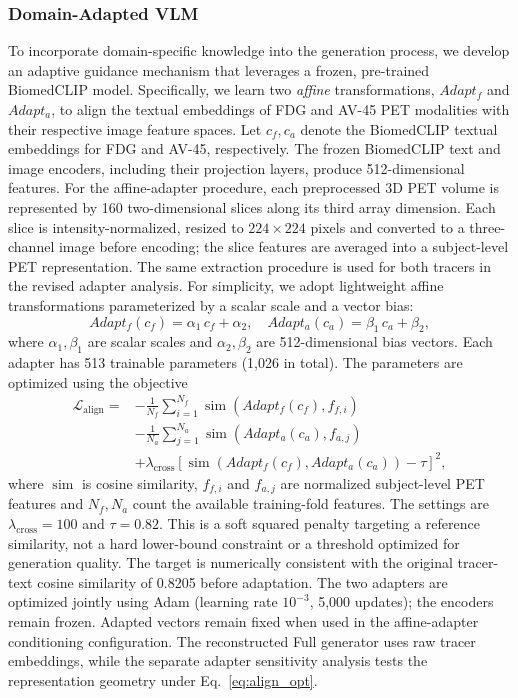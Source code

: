 \documentclass{article}
\begin{document}
\subsubsection{Domain-Adapted VLM}
To incorporate domain-specific knowledge into the generation process, we develop an adaptive guidance mechanism that leverages a frozen, pre-trained BiomedCLIP model. Specifically, we learn two \textit{affine} transformations, $Adapt_f$ and $Adapt_a$, to align the textual embeddings of FDG and AV-45 PET modalities with their respective image feature spaces. Let $c_f, c_a$ denote the BiomedCLIP textual embeddings for FDG and AV-45, respectively. The frozen BiomedCLIP text and image encoders, including their projection layers, produce 512-dimensional features. For the affine-adapter procedure, each preprocessed 3D PET volume is represented by 160 two-dimensional slices along its third array dimension. Each slice is intensity-normalized, resized to $224\times224$ pixels and converted to a three-channel image before encoding; the slice features are averaged into a subject-level PET representation. The same extraction procedure is used for both tracers in the revised adapter analysis.
For simplicity, we adopt lightweight affine transformations parameterized by a scalar scale and a vector bias:
\[
Adapt_f(c_f) = \alpha_1 \, c_f + \alpha_2, \quad
Adapt_a(c_a) = \beta_1 \, c_a + \beta_2,
\]
where $\alpha_1,\beta_1$ are scalar scales and $\alpha_2,\beta_2$ are 512-dimensional bias vectors. Each adapter has 513 trainable parameters (1,026 in total). The parameters are optimized using the objective
\begin{equation}
\begin{aligned}
\mathcal{L}_{\mathrm{align}}={}&-\frac{1}{N_f}\sum_{i=1}^{N_f}\operatorname{sim}(Adapt_f(c_f),f_{f,i})\\
&-\frac{1}{N_a}\sum_{j=1}^{N_a}\operatorname{sim}(Adapt_a(c_a),f_{a,j})\\
&+\lambda_{\mathrm{cross}}\left[\operatorname{sim}(Adapt_f(c_f),Adapt_a(c_a))-\tau\right]^2,
\end{aligned}
\label{eq:align_opt}
\end{equation}
where $\operatorname{sim}$ is cosine similarity, $f_{f,i}$ and $f_{a,j}$ are normalized subject-level PET features and $N_f,N_a$ count the available training-fold features. The settings are $\lambda_{\mathrm{cross}}=100$ and $\tau=0.82$. This is a soft squared penalty targeting a reference similarity, not a hard lower-bound constraint or a threshold optimized for generation quality. The target is numerically consistent with the original tracer-text cosine similarity of 0.8205 before adaptation. The two adapters are optimized jointly using Adam (learning rate $10^{-3}$, 5,000 updates); the encoders remain frozen. Adapted vectors remain fixed when used in the affine-adapter conditioning configuration. The reconstructed Full generator uses raw tracer embeddings, while the separate adapter sensitivity analysis tests the representation geometry under Eq.~\eqref{eq:align_opt}.
\end{document}
